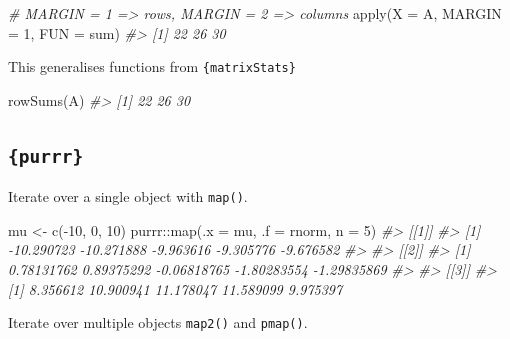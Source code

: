 \documentclass[
  12pt,
]{book}
\newenvironment{Shaded}{\begin{snugshade}}{\end{snugshade}}
\newcommand{\AttributeTok}[1]{\textcolor[rgb]{0.77,0.63,0.00}{#1}}
\newcommand{\CommentTok}[1]{\textcolor[rgb]{0.56,0.35,0.01}{\textit{#1}}}
\newcommand{\DecValTok}[1]{\textcolor[rgb]{0.00,0.00,0.81}{#1}}
\newcommand{\FunctionTok}[1]{\textcolor[rgb]{0.00,0.00,0.00}{#1}}
\newcommand{\NormalTok}[1]{#1}
\newcommand{\OtherTok}[1]{\textcolor[rgb]{0.56,0.35,0.01}{#1}}
\newcommand{\SpecialCharTok}[1]{\textcolor[rgb]{0.00,0.00,0.00}{#1}}
\begin{document}
\begin{Shaded}
\begin{Highlighting}[]
\CommentTok{\# MARGIN = 1 =\textgreater{} rows,  MARGIN = 2 =\textgreater{} columns}
\FunctionTok{apply}\NormalTok{(}\AttributeTok{X =}\NormalTok{ A, }\AttributeTok{MARGIN =} \DecValTok{1}\NormalTok{, }\AttributeTok{FUN =}\NormalTok{ sum)}
\CommentTok{\#\textgreater{} [1] 22 26 30}
\end{Highlighting}
\end{Shaded}

This generalises functions from \texttt{\{matrixStats\}}

\begin{Shaded}
\begin{Highlighting}[]
\FunctionTok{rowSums}\NormalTok{(A)}
\CommentTok{\#\textgreater{} [1] 22 26 30}
\end{Highlighting}
\end{Shaded}

\hypertarget{purrr}{%
\subsection{\texorpdfstring{\texttt{\{purrr\}}}{\{purrr\}}}\label{purrr}}

Iterate over a single object with \texttt{map()}.

\begin{Shaded}
\begin{Highlighting}[]
\NormalTok{mu }\OtherTok{\textless{}{-}} \FunctionTok{c}\NormalTok{(}\SpecialCharTok{{-}}\DecValTok{10}\NormalTok{, }\DecValTok{0}\NormalTok{, }\DecValTok{10}\NormalTok{)}
\NormalTok{purrr}\SpecialCharTok{::}\FunctionTok{map}\NormalTok{(}\AttributeTok{.x =}\NormalTok{ mu, }\AttributeTok{.f =}\NormalTok{ rnorm, }\AttributeTok{n =} \DecValTok{5}\NormalTok{)}
\CommentTok{\#\textgreater{} [[1]]}
\CommentTok{\#\textgreater{} [1] {-}10.290723 {-}10.271888  {-}9.963616  {-}9.305776  {-}9.676582}
\CommentTok{\#\textgreater{} }
\CommentTok{\#\textgreater{} [[2]]}
\CommentTok{\#\textgreater{} [1]  0.78131762  0.89375292 {-}0.06818765 {-}1.80283554 {-}1.29835869}
\CommentTok{\#\textgreater{} }
\CommentTok{\#\textgreater{} [[3]]}
\CommentTok{\#\textgreater{} [1]  8.356612 10.900941 11.178047 11.589099  9.975397}
\end{Highlighting}
\end{Shaded}

Iterate over multiple objects \texttt{map2()} and \texttt{pmap()}.
\end{document}
